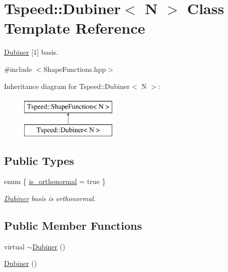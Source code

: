 \hypertarget{classTspeed_1_1Dubiner}{\section{Tspeed\-:\-:Dubiner$<$ N $>$ Class Template Reference}
\label{classTspeed_1_1Dubiner}
}


\hyperlink{classTspeed_1_1Dubiner}{Dubiner} \mbox{[}1\mbox{]} basis.  




{\ttfamily \#include $<$Shape\-Functions.\-hpp$>$}

Inheritance diagram for Tspeed\-:\-:Dubiner$<$ N $>$\-:\begin{figure}[H]
\begin{center}
\leavevmode
\includegraphics[height=2.000000cm]{classTspeed_1_1Dubiner}
\end{center}
\end{figure}
\subsection*{Public Types}
\begin{DoxyCompactItemize}
\item 
enum \{ \hyperlink{classTspeed_1_1Dubiner_aee2eaa9dbcd2aa93d7d951a9c61a10e2a749d33573b6e1a4f9c56e9d5322fd70c}{is\-\_\-orthonormal} = true
 \}
\begin{DoxyCompactList}\small\item\em \hyperlink{classTspeed_1_1Dubiner}{Dubiner} basis is orthonormal. \end{DoxyCompactList}\end{DoxyCompactItemize}
\subsection*{Public Member Functions}
\begin{DoxyCompactItemize}
\item 
virtual \hyperlink{classTspeed_1_1Dubiner_a3739d778c878f28ad63a062a210a69ae}{$\sim$\-Dubiner} ()
\item 
\hyperlink{classTspeed_1_1Dubiner_a0a4315462e09a1d2e4695b3f636ccd35}{Dubiner} ()
\end{DoxyCompactItemize}
